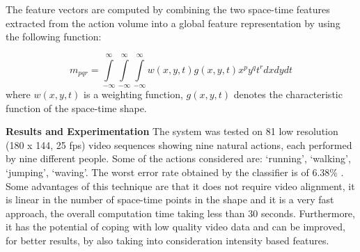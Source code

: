\documentclass[11pt]{report}
\begin{document}
The feature vectors are computed by combining the two space-time features extracted from the action volume into a global feature representation by using the following function:

\begin{equation}
m_{pqr} = \int\limits_{-\infty}^\infty \int\limits_{-\infty}^\infty \int\limits_{-\infty}^\infty w(x,y,t) g(x,y,t) x^p y^q t^r dxdydt
\end{equation}
where  \(w(x,y,t)\) is a weighting function, \(g(x,y,t)\) denotes the characteristic function of the space-time shape. 

\textbf{Results and Experimentation}
The system was tested on 81 low resolution (180 x 144, 25 fps) video sequences showing nine natural actions, each performed by nine different people. Some of the actions considered are: `running', `walking', `jumping', `waving'. The worst error rate obtained by the classifier is of 6.38\% . \\
Some advantages of this technique are that it does not require video alignment, it is linear in the number of space-time points in the shape and it is a very fast approach, the overall computation time taking less than 30 seconds. Furthermore, it has the potential of coping with low quality video data and can be improved, for better results, by also taking into consideration intensity based features. \\
\end{document}
